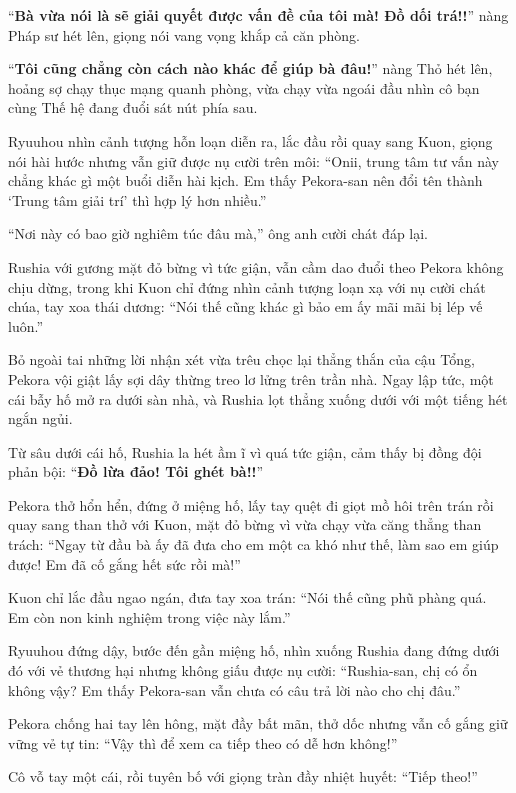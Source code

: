 \documentclass[../main.tex]{subfiles}
\begin{document}
``\textbf{Bà vừa nói là sẽ giải quyết được vấn đề của tôi mà! Đồ dối trá!!}'' nàng Pháp sư hét lên, giọng nói vang vọng khắp cả căn phòng.


``\textbf{Tôi cũng chẳng còn cách nào khác để giúp bà đâu!}'' nàng Thỏ hét lên, hoảng sợ chạy thục mạng quanh phòng, vừa chạy vừa ngoái đầu nhìn cô bạn cùng Thế hệ đang đuổi sát nút phía sau.

Ryuuhou nhìn cảnh tượng hỗn loạn diễn ra, lắc đầu rồi quay sang Kuon, giọng nói hài hước nhưng vẫn giữ được nụ cười trên môi: ``Onii, trung tâm tư vấn này chẳng khác gì một buổi diễn hài kịch. Em thấy Pekora-san nên đổi tên thành `Trung tâm giải trí' thì hợp lý hơn nhiều.''

``Nơi này có bao giờ nghiêm túc đâu mà,'' ông anh cười chát đáp lại.

Rushia với gương mặt đỏ bừng vì tức giận, vẫn cầm dao đuổi theo Pekora không chịu dừng, trong khi Kuon chỉ đứng nhìn cảnh tượng loạn xạ với nụ cười chát chúa, tay xoa thái dương: ``Nói thế cũng khác gì bảo em ấy mãi mãi bị lép vế luôn.''

Bỏ ngoài tai những lời nhận xét vừa trêu chọc lại thẳng thắn của cậu Tổng, Pekora vội giật lấy sợi dây thừng treo lơ lửng trên trần nhà. Ngay lập tức, một cái bẫy hố mở ra dưới sàn nhà, và Rushia lọt thẳng xuống dưới với một tiếng hét ngắn ngủi.


Từ sâu dưới cái hố, Rushia la hét ầm ĩ vì quá tức giận, cảm thấy bị đồng đội phản bội: ``\textbf{Đồ lừa đảo! Tôi ghét bà!!}''

Pekora thở hổn hển, đứng ở miệng hố, lấy tay quệt đi giọt mồ hôi trên trán rồi quay sang than thở với Kuon, mặt đỏ bừng vì vừa chạy vừa căng thẳng than trách: ``Ngay từ đầu bà ấy đã đưa cho em một ca khó như thế, làm sao em giúp được! Em đã cố gắng hết sức rồi mà!''

Kuon chỉ lắc đầu ngao ngán, đưa tay xoa trán: ``Nói thế cũng phũ phàng quá. Em còn non kinh nghiệm trong việc này lắm.''

Ryuuhou đứng dậy, bước đến gần miệng hố, nhìn xuống Rushia đang đứng dưới đó với vẻ thương hại nhưng không giấu được nụ cười: ``Rushia-san, chị có ổn không vậy? Em thấy Pekora-san vẫn chưa có câu trả lời nào cho chị đâu.''

Pekora chống hai tay lên hông, mặt đầy bất mãn, thở dốc nhưng vẫn cố gắng giữ vững vẻ tự tin: ``Vậy thì để xem ca tiếp theo có dễ hơn không!''

Cô vỗ tay một cái, rồi tuyên bố với giọng tràn đầy nhiệt huyết: ``Tiếp theo!''
\end{document}
